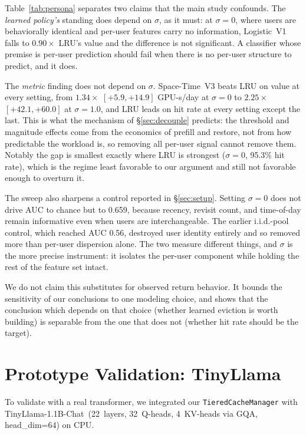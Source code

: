 \documentclass[letterpaper,twocolumn,10pt]{article}
\begin{document}
Table~\ref{tab:persona} separates two claims that the main study confounds. The
\emph{learned policy's} standing does depend on $\sigma$, as it must: at $\sigma{=}0$,
where users are behaviorally identical and per-user features carry no information,
Logistic~V1 falls to $0.90\times$ LRU's value and the difference is not significant.
A classifier whose premise is per-user prediction should fail when there is no
per-user structure to predict, and it does.

The \emph{metric} finding does not depend on $\sigma$. Space-Time~V3 beats LRU on
value at every setting, from $1.34\times$ $[+5.9, +14.9]$ GPU-s/day at $\sigma{=}0$ to
$2.25\times$ $[+42.1, +60.0]$ at $\sigma{=}1.0$, and LRU leads on hit rate at every
setting except the last. This is what the mechanism of \S\ref{sec:decouple} predicts:
the threshold and magnitude effects come from the economics of prefill and restore,
not from how predictable the workload is, so removing all per-user signal cannot
remove them. Notably the gap is smallest exactly where LRU is strongest
($\sigma{=}0$, 95.3\% hit rate), which is the regime least favorable to our argument
and still not favorable enough to overturn it.

The sweep also sharpens a control reported in \S\ref{sec:setup}. Setting $\sigma{=}0$
does not drive AUC to chance but to 0.659, because recency, revisit count, and
time-of-day remain informative even when users are interchangeable. The earlier
i.i.d.-pool control, which reached AUC 0.56, destroyed user identity entirely and so
removed more than per-user dispersion alone. The two measure different things, and
$\sigma$ is the more precise instrument: it isolates the per-user component while
holding the rest of the feature set intact.

We do not claim this substitutes for observed return behavior. It bounds the
sensitivity of our conclusions to one modeling choice, and shows that the conclusion
which depends on that choice (whether learned eviction is worth building) is
separable from the one that does not (whether hit rate should be the target).


\section{Prototype Validation: TinyLlama}
\label{sec:tinyllama}

To validate with a real transformer, we integrated our \texttt{TieredCacheManager} with TinyLlama-1.1B-Chat~(22~layers, 32~Q-heads, 4~KV-heads via GQA, head\_dim=64) on CPU.
\end{document}
